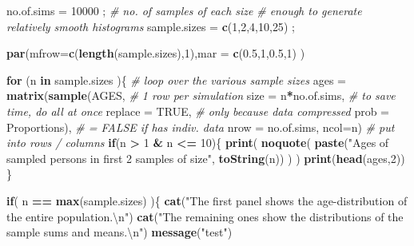 \documentclass[
]{article}
\newenvironment{Shaded}{\begin{snugshade}}{\end{snugshade}}
\newcommand{\CharTok}[1]{\textcolor[rgb]{0.31,0.60,0.02}{#1}}
\newcommand{\CommentTok}[1]{\textcolor[rgb]{0.56,0.35,0.01}{\textit{#1}}}
\newcommand{\ControlFlowTok}[1]{\textcolor[rgb]{0.13,0.29,0.53}{\textbf{#1}}}
\newcommand{\DataTypeTok}[1]{\textcolor[rgb]{0.13,0.29,0.53}{#1}}
\newcommand{\DecValTok}[1]{\textcolor[rgb]{0.00,0.00,0.81}{#1}}
\newcommand{\FloatTok}[1]{\textcolor[rgb]{0.00,0.00,0.81}{#1}}
\newcommand{\KeywordTok}[1]{\textcolor[rgb]{0.13,0.29,0.53}{\textbf{#1}}}
\newcommand{\NormalTok}[1]{#1}
\newcommand{\OperatorTok}[1]{\textcolor[rgb]{0.81,0.36,0.00}{\textbf{#1}}}
\newcommand{\OtherTok}[1]{\textcolor[rgb]{0.56,0.35,0.01}{#1}}
\newcommand{\StringTok}[1]{\textcolor[rgb]{0.31,0.60,0.02}{#1}}
\begin{document}
\begin{Shaded}
\begin{Highlighting}[]
\NormalTok{no.of.sims =}\StringTok{ }\DecValTok{10000}\NormalTok{ ;  }\CommentTok{# no. of samples of each size}
                      \CommentTok{# enough to generate relatively smooth histograms  }
\NormalTok{sample.sizes =}\StringTok{ }\KeywordTok{c}\NormalTok{(}\DecValTok{1}\NormalTok{,}\DecValTok{2}\NormalTok{,}\DecValTok{4}\NormalTok{,}\DecValTok{10}\NormalTok{,}\DecValTok{25}\NormalTok{) ; }

\KeywordTok{par}\NormalTok{(}\DataTypeTok{mfrow=}\KeywordTok{c}\NormalTok{(}\KeywordTok{length}\NormalTok{(sample.sizes),}\DecValTok{1}\NormalTok{),}\DataTypeTok{mar =} \KeywordTok{c}\NormalTok{(}\FloatTok{0.5}\NormalTok{,}\DecValTok{1}\NormalTok{,}\FloatTok{0.5}\NormalTok{,}\DecValTok{1}\NormalTok{) )}

\ControlFlowTok{for}\NormalTok{ (n }\ControlFlowTok{in}\NormalTok{ sample.sizes )\{        }\CommentTok{# loop over the various sample sizes}
\NormalTok{   ages =}\StringTok{ }\KeywordTok{matrix}\NormalTok{(}\KeywordTok{sample}\NormalTok{(AGES,          }\CommentTok{# 1 row per simulation}
              \DataTypeTok{size =}\NormalTok{ n}\OperatorTok{*}\NormalTok{no.of.sims,     }\CommentTok{# to save time, do all at once}
              \DataTypeTok{replace =} \OtherTok{TRUE}\NormalTok{,          }\CommentTok{# only because data compressed}
              \DataTypeTok{prob =}\NormalTok{ Proportions),     }\CommentTok{# = FALSE if has indiv. data}
          \DataTypeTok{nrow =}\NormalTok{ no.of.sims, }\DataTypeTok{ncol=}\NormalTok{n) }\CommentTok{# put into rows / columns}
   \ControlFlowTok{if}\NormalTok{(n }\OperatorTok{>}\StringTok{ }\DecValTok{1} \OperatorTok{&}\StringTok{ }\NormalTok{n }\OperatorTok{<=}\StringTok{ }\DecValTok{10}\NormalTok{)\{}
     \KeywordTok{print}\NormalTok{( }\KeywordTok{noquote}\NormalTok{(}
      \KeywordTok{paste}\NormalTok{(}\StringTok{"Ages of sampled persons in first 2 samples of size"}\NormalTok{,  }
            \KeywordTok{toString}\NormalTok{(n)) )   ) }
     \KeywordTok{print}\NormalTok{(}\KeywordTok{head}\NormalTok{(ages,}\DecValTok{2}\NormalTok{))}
\NormalTok{   \}}
   
   \ControlFlowTok{if}\NormalTok{( n }\OperatorTok{==}\StringTok{ }\KeywordTok{max}\NormalTok{(sample.sizes) )\{}
     \KeywordTok{cat}\NormalTok{(}\StringTok{"The first panel shows the age-distribution of the entire population.}\CharTok{\textbackslash{}n}\StringTok{"}\NormalTok{)}
     \KeywordTok{cat}\NormalTok{(}\StringTok{"The remaining ones show the  distributions of the sample sums and means.}\CharTok{\textbackslash{}n}\StringTok{"}\NormalTok{)}
     \KeywordTok{message}\NormalTok{(}\StringTok{"test"}\NormalTok{)}
     

\end{Highlighting}
\end{Shaded}
\end{document}
